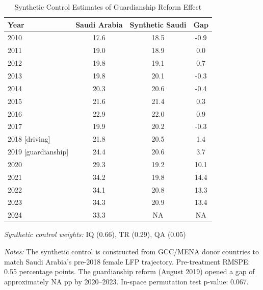 \begin{table}[htbp]
\centering
\caption{Synthetic Control Estimates of Guardianship Reform Effect}
\label{tab:scm}
\begin{tabular}{lccc}
\hline\hline
Year & Saudi Arabia & Synthetic Saudi & Gap \\
\hline
2010 & 17.6 & 18.5 & -0.9 \\
2011 & 19.0 & 18.9 & 0.0 \\
2012 & 19.8 & 19.1 & 0.7 \\
2013 & 19.8 & 20.1 & -0.3 \\
2014 & 20.3 & 20.6 & -0.4 \\
2015 & 21.6 & 21.4 & 0.3 \\
2016 & 22.9 & 22.0 & 0.9 \\
2017 & 19.9 & 20.2 & -0.3 \\
2018 [driving] & 21.8 & 20.5 & 1.4 \\
2019 [guardianship] & 24.4 & 20.6 & 3.7 \\
2020 & 29.3 & 19.2 & 10.1 \\
2021 & 34.2 & 19.8 & 14.4 \\
2022 & 34.1 & 20.8 & 13.3 \\
2023 & 34.3 & 20.9 & 13.4 \\
2024 & 33.3 & NA & NA \\
\hline\hline
\end{tabular}
\vspace{1em}
\textit{Synthetic control weights:} IQ (0.66), TR (0.29), QA (0.05) 
\begin{minipage}{0.95\textwidth}
{\footnotesize \textit{Notes:} The synthetic control is constructed from GCC/MENA donor countries to match Saudi Arabia's pre-2018 female LFP trajectory. Pre-treatment RMSPE: 0.55 percentage points. The guardianship reform (August 2019) opened a gap of approximately NA pp by 2020--2023. In-space permutation test p-value: 0.067.}
\end{minipage}
\end{table}
